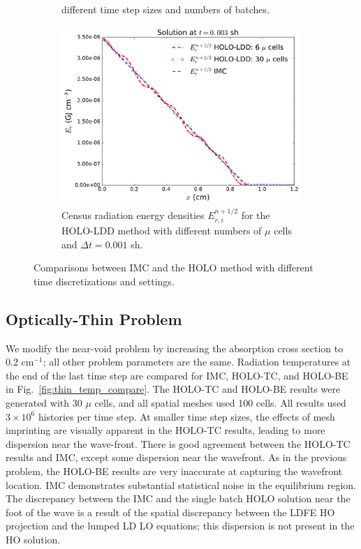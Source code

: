 \documentclass{anstrans}
\newcommand{\invcm}[0]{cm$^{-1}$}
\begin{document}
\begin{figure}[th!]
\begin{subfigure}{0.48\textwidth}
{    different time step sizes and numbers of batches.}
\end{subfigure}
\begin{subfigure}{0.52\textwidth}
  \centering
    \includegraphics[width=\textwidth]{void_ang_compare.pdf}
    \caption{\label{fig:bumps} Census radiation energy densities $E_{r,i}^{n+1/2}$ for
    the HOLO-LDD method with different numbers of $\mu$ cells and $\Delta t=0.001$ sh.
}
\end{subfigure}
\caption{Comparisons between IMC and the HOLO method with different time discretizations and
settings.}
\end{figure}  


\subsection{Optically-Thin Problem}

We modify the near-void problem by increasing the absorption cross section to 0.2
\invcm; all other problem parameters are the same.  Radiation temperatures at the end of
the last time step are compared for IMC, HOLO-TC, and HOLO-BE in
Fig.~\ref{fig:thin_temp_compare}.  The HOLO-TC and HOLO-BE results were generated with 30
$\mu$ cells, and all spatial meshes used 100 cells.  All results used $3\times10^6$
histories per time step.  At smaller time step sizes, the
effects of mesh imprinting are visually apparent in the HOLO-TC results, leading to more
dispersion near the wave-front.  There is good agreement between
the HOLO-TC results and IMC, except some dispersion near the wavefront.
As in the previous problem, the HOLO-BE results are very
inaccurate at capturing the wavefront location. 
IMC demonstrates substantial statistical noise in the equilibrium region.
The discrepancy between the IMC
and the single batch HOLO solution near the foot of
the wave is a result of the spatial discrepancy between the LDFE HO projection and the
lumped LD LO equations; this dispersion is not present in the HO solution. 
\end{document}
